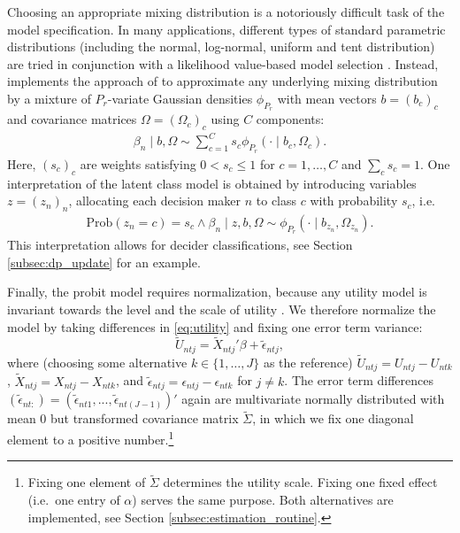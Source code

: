 \documentclass[article,shortnames]{jss}
\begin{document}
Choosing an appropriate mixing distribution is a notoriously difficult task of the model specification. In many applications, different types of standard parametric distributions (including the normal, log-normal, uniform and tent distribution) are tried in conjunction with a likelihood value-based model selection \citep[pp.\ 136 ff.]{Train:2009}. Instead,  implements the approach of \cite{Oelschlaeger:2020} to approximate any underlying mixing distribution by a mixture of $P_r$-variate Gaussian densities $\phi_{P_r}$ with mean vectors $b=(b_c)_{c}$ and covariance matrices $\Omega=(\Omega_c)_{c}$ using $C$ components:
\begin{align*}
\beta_n\mid b,\Omega \sim \sum_{c=1}^{C} s_c \phi_{P_r} (\cdot \mid b_c,\Omega_c).
\end{align*}
Here, $(s_c)_{c}$ are weights satisfying $0 < s_c\leq 1$ for $c=1,\dots,C$ and $\sum_c s_c=1$. One interpretation of the latent class model is obtained by introducing variables $z=(z_n)_n$, allocating each decision maker $n$ to class $c$ with probability $s_c$, i.e.\
\begin{align*}
\text{Prob}(z_n=c)=s_c \land \beta_n \mid z,b,\Omega \sim \phi_{P_r}(\cdot \mid b_{z_n},\Omega_{z_n}).
\end{align*}
This interpretation allows for decider classifications, see Section \ref{subsec:dp_update} for an example.

Finally, the probit model requires normalization, because any utility model is invariant towards the level and the scale of utility \citep[Ch.\ 2]{Train:2009}. We therefore normalize the model by taking differences in \eqref{eq:utility} and fixing one error term variance:
\begin{equation}
\label{eq:utility_diff}
\tilde{U}_{ntj} = \tilde{X}_{ntj}' \beta + \tilde{\epsilon}_{ntj},
\end{equation}
where (choosing some alternative $k \in \{1,\dots,J\}$ as the reference) $\tilde{U}_{ntj} = U_{ntj} - U_{ntk}$, $\tilde{X}_{ntj} = X_{ntj} - X_{ntk}$, and $\tilde{\epsilon}_{ntj} = \epsilon_{ntj} - \epsilon_{ntk}$ for $j\neq k$. The error term differences $(\tilde{\epsilon}_{nt:}) = (\tilde{\epsilon}_{nt1},...,\tilde{\epsilon}_{nt(J-1)})'$ again are multivariate normally distributed with mean 0 but transformed covariance matrix $\tilde{\Sigma}$, in which we fix one diagonal element to a positive number.\footnote{Fixing one element of $\tilde{\Sigma}$ determines the utility scale. Fixing one fixed effect (i.e.\ one entry of $\alpha$) serves the same purpose. Both alternatives are implemented, see Section \ref{subsec:estimation_routine}.}
\end{document}
